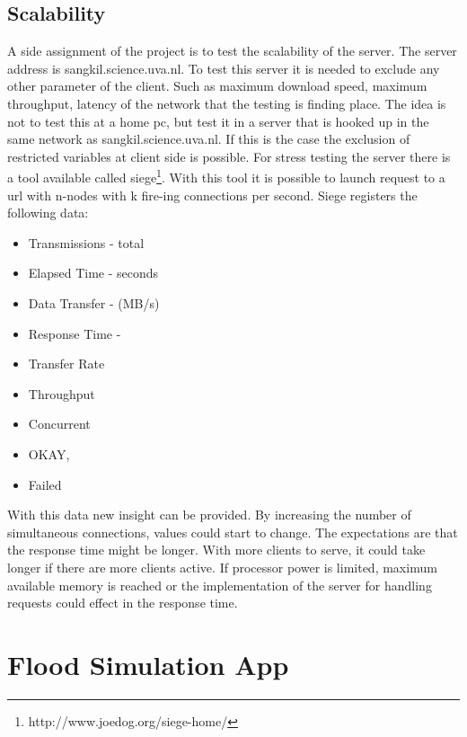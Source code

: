 \documentclass[10pt,a4paper]{article}
\begin{document}
\subsection{Scalability}
A side assignment of the project is to test the scalability of the server. The server address is sangkil.science.uva.nl. To test this server it is needed to exclude any other parameter of the client. Such as maximum download speed, maximum throughput, latency of the network that the testing is finding place. The idea is not to test this at a home pc, but test it in a server that is hooked up in the same network as sangkil.science.uva.nl. If this is the case the exclusion of restricted variables at client side is possible. 
For stress testing the server there is a tool available called siege\footnote{http://www.joedog.org/siege-home/}. With this tool it is possible to launch request to a url with n-nodes with k fire-ing connections per second. Siege registers the following data:
\begin{itemize}
\item Transmissions - total
\item Elapsed Time - seconds
\item Data Transfer - (MB/s)
\item Response Time - 
\item Transfer Rate
\item Throughput
\item Concurrent
\item OKAY,
\item Failed
\end{itemize}
With this data new insight can be provided. By increasing the number of simultaneous connections, values could start to change. The expectations are that the response time might be longer. With more clients to serve, it could take longer if there are more clients active. If processor power is limited, maximum available memory is reached or the implementation of the server for handling requests could effect in the response time. 

\section{Flood Simulation App}
\end{document}
